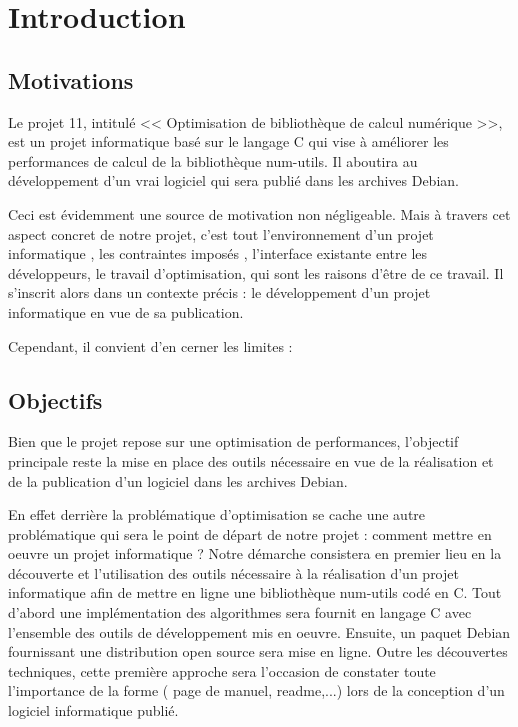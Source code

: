 \chapter{Introduction}
\label{chap:introduction}

\section{Motivations }

Le projet 11, intitul\'e << Optimisation de biblioth\`eque de calcul num\'erique >>, est un projet informatique bas\'e sur le langage C qui vise \`a am\'eliorer 
les performances de calcul de la biblioth\`eque num-utils. Il aboutira au d\'eveloppement d'un vrai logiciel qui sera publi\'e dans les archives Debian.

Ceci est \'evidemment une source de motivation non n\'egligeable. Mais \`a travers cet aspect concret de notre projet, c'est tout l'environnement d'un 
projet informatique , les contraintes impos\'es , l'interface existante entre les d\'eveloppeurs, le travail d'optimisation, qui sont les raisons 
d'\^etre de ce travail.
Il s'inscrit alors dans un contexte pr\'ecis : le d\'eveloppement d'un projet informatique en vue de sa publication.

Cependant, il convient d'en cerner les limites : 

\section{Objectifs}

Bien que le projet repose sur une optimisation de performances, l'objectif principale reste la mise en place des outils n\'ecessaire en vue de la 
r\'ealisation et de la publication d'un logiciel dans les archives Debian.  

En effet derri\`ere la probl\'ematique d'optimisation se cache une autre probl\'ematique qui sera le point de d\'epart de notre projet : comment mettre
 en oeuvre un projet informatique ? 
Notre d\'emarche consistera en premier lieu en la d\'ecouverte et l'utilisation des outils n\'ecessaire \`a la r\'ealisation d'un projet informatique afin 
de mettre en ligne une biblioth\`eque num-utils cod\'e en C.
\newline 	
Tout d'abord une impl\'ementation des algorithmes sera fournit en langage C avec l'ensemble des outils de d\'eveloppement mis en oeuvre. Ensuite, 
un paquet Debian fournissant une distribution open source sera mise en ligne. 
Outre les d\'ecouvertes techniques, cette premi\`ere approche sera l'occasion de constater toute l'importance de la forme ( page de manuel, readme,...) 
lors de la conception d'un logiciel informatique publi\'e.

